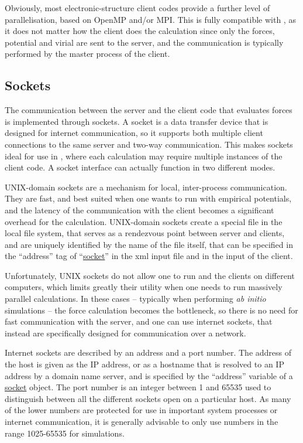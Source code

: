 \documentclass[11pt,english,fleqn]{report}
\begin{document}
Obviously, most electronic-structure client codes provide a further level
of parallelisation, based on OpenMP and/or MPI. This is fully compatible with
\ipi, as it does not matter how the client does the calculation since
only the forces, potential and virial are sent to the server, and the communication
is typically performed by the master process of the client. 


\subsection{Sockets} \label{sockets}

The communication between the \ipi server and the client code that
evaluates forces is implemented through sockets. A socket is a 
data transfer device that is designed for internet communication,
so it supports both multiple client connections to the same server and
two-way communication. This makes sockets ideal for use in \ipi,
where each calculation may require multiple instances of the client code. 
A socket interface can actually function in two different modes.

UNIX-domain sockets are a mechanism for local, inter-process
communication. They are fast, and best suited when one wants
to run \ipi  with empirical potentials, and the latency of the 
communication with the client becomes a significant overhead
for the calculation. UNIX-domain sockets create a special file
in the local file system, that serves as a rendezvous point
between server and clients, and are uniquely identified by the
name of the file itself, that can be specified in the ``address'' tag of 
``\hyperref[FFSOCKET]{socket}'' in the xml input file and in 
the input of the client.

Unfortunately, UNIX sockets do not allow one to run \ipi{} and 
the clients on different computers, which limits greatly their 
utility when  one needs to run massively parallel calculations. 
In these cases -- typically when performing \emph{ab initio} 
simulations -- the force calculation becomes the bottleneck, so there is no
need for fast communication with the server, and one can 
use internet sockets, that instead are specifically designed
for communication over a network.

Internet sockets are described by an address and a port number.
The address of the host is given as the IP address,
or as a hostname that is resolved to an IP address by a domain name server,
and is specified by the {}``address'' variable of a 
\hyperref[FFSOCKET]{socket} object. 
The port number is an integer between 1 and 65535 used to distinguish
between all the different sockets open on a particular host. As
many of the lower numbers are protected for use in important system
processes or internet communication, it is generally advisable to
only use numbers in the range 1025-65535 for simulations.
\end{document}
